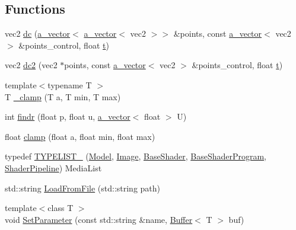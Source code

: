 \subsection*{Functions}
\begin{DoxyCompactItemize}
\item 
vec2 \hyperlink{namespace_agmd_ae82ebcf7c190c2965b357644e6cb8cdf}{dc} (\hyperlink{_vector_8h_a3df82cea60ff4ad0acb44e58454406a5}{a\+\_\+vector}$<$ \hyperlink{_vector_8h_a3df82cea60ff4ad0acb44e58454406a5}{a\+\_\+vector}$<$ vec2 $>$$>$ \&points, const \hyperlink{_vector_8h_a3df82cea60ff4ad0acb44e58454406a5}{a\+\_\+vector}$<$ vec2 $>$ \&points\+\_\+control, float \hyperlink{_examples_2_planet_2_app_8cpp_a125ce9f8ead659256dbdd0816ede24d4}{t})
\item 
vec2 \hyperlink{namespace_agmd_a05f68df6d20d95c54cb74548e2be55d8}{dc2} (vec2 $\ast$points, const \hyperlink{_vector_8h_a3df82cea60ff4ad0acb44e58454406a5}{a\+\_\+vector}$<$ vec2 $>$ \&points\+\_\+control, float \hyperlink{_examples_2_planet_2_app_8cpp_a125ce9f8ead659256dbdd0816ede24d4}{t})
\item 
{\footnotesize template$<$typename T $>$ }\\T \hyperlink{namespace_agmd_ad519b6959d91b01197a85bc16afb0154}{\+\_\+clamp} (T a, T min, T max)
\item 
int \hyperlink{namespace_agmd_a557d7d5e27fd5484c3edc33fc9f1dceb}{findr} (float p, float u, \hyperlink{_vector_8h_a3df82cea60ff4ad0acb44e58454406a5}{a\+\_\+vector}$<$ float $>$ U)
\item 
float \hyperlink{namespace_agmd_a72d044b29b66f79f12c8c9671d8e2371}{clamp} (float a, float min, float max)
\item 
typedef \hyperlink{namespace_agmd_a424fa2cd5cf0c33277b03d8e0657ee3b}{T\+Y\+P\+E\+L\+I\+S\+T\+\_} (\hyperlink{class_agmd_1_1_model}{Model}, \hyperlink{class_agmd_1_1_image}{Image}, \hyperlink{class_agmd_1_1_base_shader}{Base\+Shader}, \hyperlink{class_agmd_1_1_base_shader_program}{Base\+Shader\+Program}, \hyperlink{class_agmd_1_1_shader_pipeline}{Shader\+Pipeline}) Media\+List
\item 
std\+::string \hyperlink{namespace_agmd_ab722a3fbc138ba8d61d51264774fd09a}{Load\+From\+File} (std\+::string path)
\item 
{\footnotesize template$<$class T $>$ }\\void \hyperlink{namespace_agmd_a80567601be99fab01af174b42e542c6f}{Set\+Parameter} (const std\+::string \&name, \hyperlink{class_agmd_1_1_buffer}{Buffer}$<$ T $>$ buf)
\item 
$$
\end{DoxyCompactItemize}
